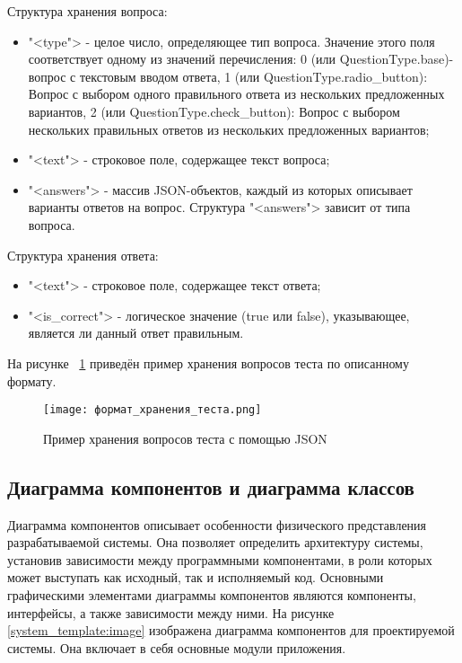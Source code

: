 Структура хранения вопроса:
\begin{itemize}
	\item "<type"> - целое число, определяющее тип вопроса. Значение этого поля соответствует одному из значений перечисления: 0 (или QuestionType.base)- вопрос с текстовым вводом ответа, 1 (или QuestionType.radio\_button): Вопрос с выбором одного правильного ответа из нескольких предложенных вариантов, 2 (или QuestionType.check\_button): Вопрос с выбором нескольких правильных ответов из нескольких предложенных вариантов;
	\item "<text"> - строковое поле, содержащее текст вопроса;
	\item "<answers"> - массив JSON-объектов, каждый из которых описывает варианты ответов на вопрос. Структура "<answers"> зависит от типа вопроса.
\end{itemize}

Структура хранения ответа:
\begin{itemize}
	\item "<text"> - строковое поле, содержащее текст ответа;
	\item "<is\_correct"> - логическое значение (true или false), указывающее, является ли данный ответ правильным.
\end{itemize}

На рисунке ~\ref{question_storage_format:image} приведён пример хранения вопросов теста по описанному формату.

\begin{figure}[H]
	\centering
	\texttt{[image: формат\_хранения\_теста.png]}
	\caption{Пример хранения вопросов теста с помощью JSON}
	\label{question_storage_format:image}
\end{figure}

\subsection{Диаграмма компонентов и диаграмма классов}

Диаграмма компонентов описывает особенности физического представления разрабатываемой системы. Она позволяет определить архитектуру системы, установив зависимости между программными компонентами, в роли которых может выступать как исходный, так и исполняемый код. Основными графическими элементами диаграммы компонентов являются компоненты, интерфейсы, а также зависимости между ними. На рисунке \ref{system_template:image} изображена диаграмма компонентов для проектируемой системы. Она включает в себя основные модули приложения. 

